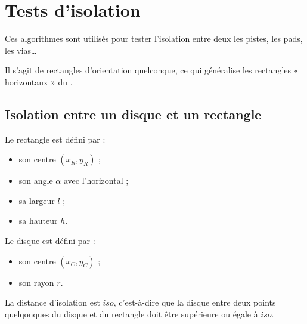 

\chapter{Tests d'isolation}

Ces algorithmes sont utilisés pour tester l'isolation entre deux les pistes, les pads, les vias…





Il s'agit de rectangles d'orientation quelconque, ce qui généralise les rectangles « horizontaux » du .

\section{Isolation entre un disque et un rectangle}

Le rectangle est défini par :
\begin{itemize}
  \item son centre $(x_R, y_R)$ ;
  \item son angle $\alpha$ avec l'horizontal ;
  \item sa largeur $l$ ;
  \item sa hauteur $h$.
\end{itemize}

Le disque est défini par :
\begin{itemize}
  \item son centre $(x_C, y_C)$ ;
  \item son rayon $r$.
\end{itemize}

La distance d'isolation est $iso$, c'est-à-dire que la disque entre deux points quelqonques du disque et du rectangle doit être supérieure ou égale à $iso$.

\begin{center}
\end{center}

